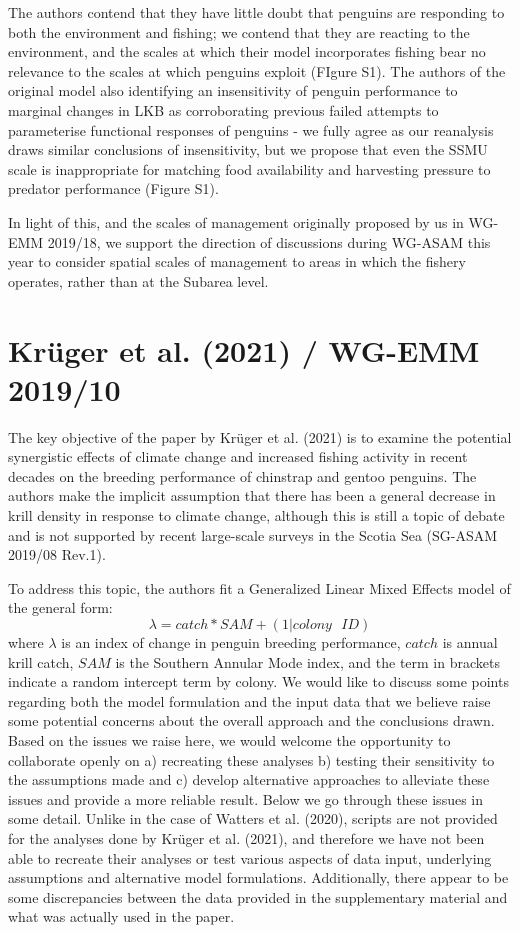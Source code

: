 \documentclass[]{elsarticle} %
\begin{document}
The authors contend that they have little doubt that penguins are
responding to both the environment and fishing; we contend that they are
reacting to the environment, and the scales at which their model
incorporates fishing bear no relevance to the scales at which penguins
exploit (FIgure S1). The authors of the original model also identifying
an insensitivity of penguin performance to marginal changes in LKB as
corroborating previous failed attempts to parameterise functional
responses of penguins - we fully agree as our reanalysis draws similar
conclusions of insensitivity, but we propose that even the SSMU scale is
inappropriate for matching food availability and harvesting pressure to
predator performance (Figure S1).

In light of this, and the scales of management originally proposed by us
in WG-EMM 2019/18, we support the direction of discussions during
WG-ASAM this year to consider spatial scales of management to areas in
which the fishery operates, rather than at the Subarea level.

\hypertarget{kruger2021-wg-emm-201910}{%
\section{Krüger et al. (2021) / WG-EMM
2019/10}\label{kruger2021-wg-emm-201910}}

The key objective of the paper by Krüger et al. (2021) is to examine the
potential synergistic effects of climate change and increased fishing
activity in recent decades on the breeding performance of chinstrap and
gentoo penguins. The authors make the implicit assumption that there has
been a general decrease in krill density in response to climate change,
although this is still a topic of debate and is not supported by recent
large-scale surveys in the Scotia Sea (SG-ASAM 2019/08 Rev.1).

To address this topic, the authors fit a Generalized Linear Mixed
Effects model of the general form:
\[\lambda=catch*SAM+(1|colony\text{ }ID)\] where \(\lambda\) is an index
of change in penguin breeding performance, \(catch\) is annual krill
catch, \(SAM\) is the Southern Annular Mode index, and the term in
brackets indicate a random intercept term by colony. We would like to
discuss some points regarding both the model formulation and the input
data that we believe raise some potential concerns about the overall
approach and the conclusions drawn. Based on the issues we raise here,
we would welcome the opportunity to collaborate openly on a) recreating
these analyses b) testing their sensitivity to the assumptions made and
c) develop alternative approaches to alleviate these issues and provide
a more reliable result. Below we go through these issues in some detail.
Unlike in the case of Watters et al. (2020), scripts are not provided
for the analyses done by Krüger et al. (2021), and therefore we have not
been able to recreate their analyses or test various aspects of data
input, underlying assumptions and alternative model formulations.
Additionally, there appear to be some discrepancies between the data
provided in the supplementary material and what was actually used in the
paper.
\end{document}
